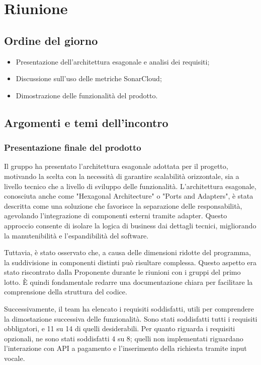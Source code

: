 \section{Riunione}
\subsection{Ordine del giorno}
\begin{itemize}
    \item Presentazione dell'architettura esagonale e analisi dei requisiti;
    \item Discussione sull'uso delle metriche SonarCloud;
    \item Dimostrazione delle funzionalità del prodotto.
\end{itemize}

\subsection{Argomenti e temi dell'incontro}

\subsubsection{Presentazione finale del prodotto}

\par Il gruppo ha presentato l'architettura esagonale adottata per il progetto, motivando la scelta con la necessità di garantire scalabilità orizzontale, sia a livello tecnico che a livello di sviluppo delle funzionalità. L'architettura esagonale, conosciuta anche come "Hexagonal Architecture" o "Ports and Adapters", è stata descritta come una soluzione che favorisce la separazione delle responsabilità, agevolando l'integrazione di componenti esterni tramite adapter. Questo approccio consente di isolare la logica di business dai dettagli tecnici, migliorando la manutenibilità e l'espandibilità del software.

\par Tuttavia, è stato osservato che, a causa delle dimensioni ridotte del programma, la suddivisione in componenti distinti può risultare complessa. Questo aspetto era stato riscontrato dalla Proponente durante le riunioni con i gruppi del primo lotto. È quindi fondamentale redarre una documentazione chiara per facilitare la comprensione della struttura del codice.

\par Successivamente, il team ha elencato i requisiti soddisfatti, utili per comprendere la dimostazione successiva delle funzionalità. Sono stati soddisfatti tutti i requisiti obbligatori, e 11 su 14 di quelli desiderabili. Per quanto riguarda i requisiti opzionali, ne sono stati soddisfatti 4 su 8; quelli non implementati riguardano l'interazione con API a pagamento e l'inserimento della richiesta tramite input vocale.

